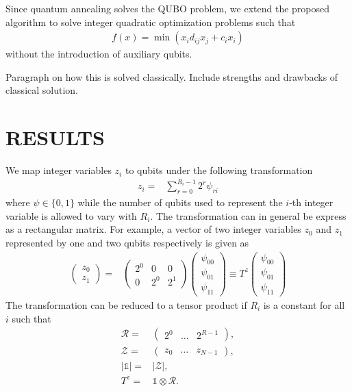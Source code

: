 \documentclass[fleqn,10pt]{wlscirep}
\begin{document}
Since quantum annealing solves the QUBO problem, we extend the proposed algorithm to solve integer quadratic optimization problems such that
\begin{align}
f(x) = \min(x_i d_{ij} x_j + c_i x_i)
\end{align}
without the introduction of auxiliary qubits.

{\color{red} Paragraph on how this is solved classically. Include strengths and drawbacks of classical solution.}

\section{RESULTS}
\label{sec:results}
We map integer variables $z_i$ to qubits under the following transformation~\cite{Chang:2018uoc}
\begin{align}
z_i = & \sum_{r=0}^{R_i-1} 2^r \psi_{ri}
\label{eq:int_to_bin}
\end{align}
where $\psi \in \{0, 1\}$ while the number of qubits used to represent the $i$-th integer variable is allowed to vary with $R_i$. The transformation can in general be express as a rectangular matrix. For example, a vector of two integer variables $z_0$ and $z_1$ represented by one and two qubits respectively is given as
\begin{align}
\begin{pmatrix}
z_0\\
z_1
\end{pmatrix}
= &
\begin{pmatrix}
2^0 & 0 & 0\\
0 & 2^0 & 2^1
\end{pmatrix}
\begin{pmatrix}
\psi_{00}\\
\psi_{01}\\
\psi_{11}
\end{pmatrix}
\equiv T^z \begin{pmatrix}
\psi_{00}\\
\psi_{01}\\
\psi_{11}
\end{pmatrix}
\end{align}
The transformation can be reduced to a tensor product if $R_i$ is a constant for all $i$ such that
\begin{align}
\mathcal{R} = & \begin{pmatrix} 2^0 & \dots & 2^{R-1}\end{pmatrix},\\
\mathcal{Z} = & \begin{pmatrix} z_0 & \dots & z_{N-1}\end{pmatrix},\\
|\mathds{1}| = & |\mathcal{Z}|,\\
T^z = & \mathds{1}\otimes \mathcal{R}.
\end{align}
\end{document}
